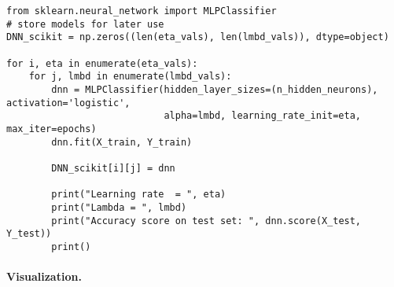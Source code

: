 \begin{verbatim}
from sklearn.neural_network import MLPClassifier
# store models for later use
DNN_scikit = np.zeros((len(eta_vals), len(lmbd_vals)), dtype=object)

for i, eta in enumerate(eta_vals):
    for j, lmbd in enumerate(lmbd_vals):
        dnn = MLPClassifier(hidden_layer_sizes=(n_hidden_neurons), activation='logistic',
                            alpha=lmbd, learning_rate_init=eta, max_iter=epochs)
        dnn.fit(X_train, Y_train)
        
        DNN_scikit[i][j] = dnn
        
        print("Learning rate  = ", eta)
        print("Lambda = ", lmbd)
        print("Accuracy score on test set: ", dnn.score(X_test, Y_test))
        print()

\end{verbatim}


\paragraph{Visualization.}



































